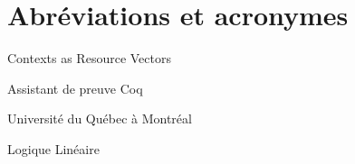 %
\section*{Abréviations et acronymes}
\label{sec::acronymes}

\vspace{10 mm}
\begin{description}[align=right,labelwidth=2cm] 
\item [CARVe] Contexts as Resource Vectors
\item [Coq] Assistant de preuve Coq
\item [UQAM] Université du Québec à Montréal
\item [LL] Logique Linéaire
\end{description}
